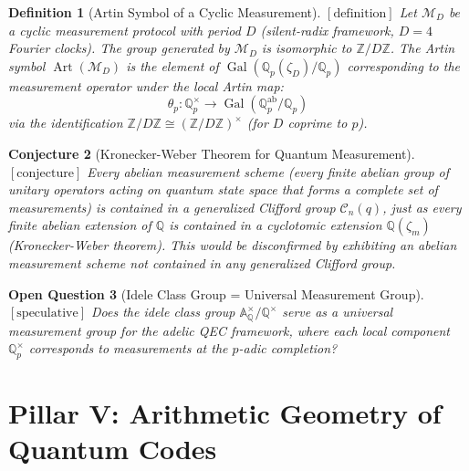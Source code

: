 \documentclass[12pt]{article}
\newtheorem{definition}{Definition}[section]
\newtheorem{conjecture}[definition]{Conjecture}
\newtheorem{question}[definition]{Open Question}
\theoremstyle{remark}
\begin{document}
\begin{definition}[Artin Symbol of a Cyclic Measurement]
$[\text{definition}]$
Let $\mathcal{M}_D$ be a cyclic measurement protocol with period $D$
(silent-radix framework, $D=4$ Fourier clocks). The group generated by
$\mathcal{M}_D$ is isomorphic to $\mathbb{Z}/D\mathbb{Z}$. The
\emph{Artin symbol} $\operatorname{Art}(\mathcal{M}_D)$ is the element
of $\operatorname{Gal}(\mathbb{Q}_p(\zeta_D)/\mathbb{Q}_p)$
corresponding to the measurement operator under the local Artin map:
\[
\theta_p: \mathbb{Q}_p^\times \to
\operatorname{Gal}(\mathbb{Q}_p^{\text{ab}}/\mathbb{Q}_p)
\]
via the identification $\mathbb{Z}/D\mathbb{Z} \cong
(\mathbb{Z}/D\mathbb{Z})^\times$ (for $D$ coprime to $p$).
\end{definition}

\begin{conjecture}[Kronecker-Weber Theorem for Quantum Measurement]
$[\text{conjecture}]$
Every abelian measurement scheme (every finite abelian group of unitary
operators acting on quantum state space that forms a complete set of
measurements) is contained in a generalized Clifford group $\mathcal{C}_n(q)$,
just as every finite abelian extension of $\mathbb{Q}$ is contained in a
cyclotomic extension $\mathbb{Q}(\zeta_m)$ (Kronecker-Weber theorem).
This would be disconfirmed by exhibiting an abelian measurement scheme
not contained in any generalized Clifford group.
\end{conjecture}

\begin{question}[Idele Class Group = Universal Measurement Group]
$[\text{speculative}]$
Does the idele class group $\mathbb{A}_\mathbb{Q}^\times/\mathbb{Q}^\times$
serve as a universal measurement group for the adelic QEC framework,
where each local component $\mathbb{Q}_p^\times$ corresponds to measurements
at the $p$-adic completion?
\end{question}

\section{Pillar V: Arithmetic Geometry of Quantum Codes}
\end{document}
